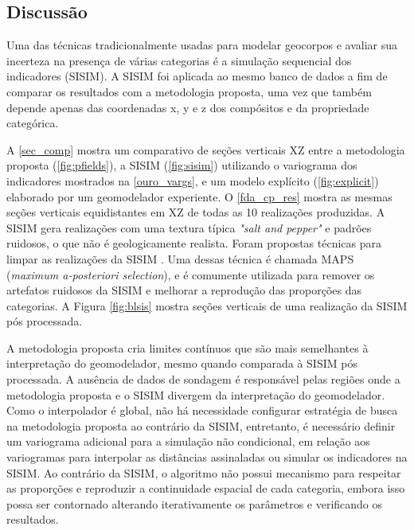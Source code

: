 \subsection{Discussão}

Uma das técnicas tradicionalmente usadas para modelar geocorpos e avaliar sua incerteza na presença de várias categorias é a simulação sequencial dos indicadores (SISIM). A SISIM foi aplicada ao mesmo banco de dados a fim de comparar os resultados com a metodologia proposta, uma vez que também depende apenas das coordenadas x, y e z dos compósitos e da propriedade categórica.

A \autoref{sec_comp} mostra um comparativo de seções verticais XZ entre a metodologia proposta (\autoref{fig:pfields}), a SISIM (\autoref{fig:sisim}) utilizando o variograma dos indicadores mostrados na \autoref{ouro_vargs}, e um modelo explícito (\autoref{fig:explicit}) elaborado por um geomodelador experiente. O \autoref{fda_cp_res} mostra as mesmas seções verticais equidistantes em XZ de todas as 10 realizações produzidas. A SISIM gera realizações com uma textura típica \textit{"salt and pepper"} e padrões ruidosos, o que não é geologicamente realista. Foram propostas técnicas para limpar as realizações da SISIM \cite{DEUTSCH1998551, yamamoto2015post}. Uma dessas técnica é chamada MAPS (\textit{maximum a-posteriori selection}), e é comumente utilizada para remover os artefatos ruidosos da SISIM e melhorar a reprodução das proporções das categorias. A Figura \autoref{fig:blsis} mostra seções verticais de uma realização da SISIM pós processada.

A metodologia proposta cria limites contínuos que são mais semelhantes à interpretação do geomodelador, mesmo quando comparada à SISIM pós processada. A ausência de dados de sondagem é responsável pelas regiões onde a metodologia proposta e o SISIM divergem da interpretação do geomodelador. Como o interpolador é global, não há necessidade configurar estratégia de busca na metodologia proposta ao contrário da SISIM, entretanto, é necessário definir um variograma adicional para a simulação não condicional, em relação aos variogramas para interpolar as distâncias assinaladas ou simular os indicadores na SISIM. Ao contrário da SISIM, o algoritmo não possui mecanismo para respeitar as proporções e reproduzir a continuidade espacial de cada categoria, embora isso possa ser contornado alterando iterativamente os parâmetros e verificando os resultados.

